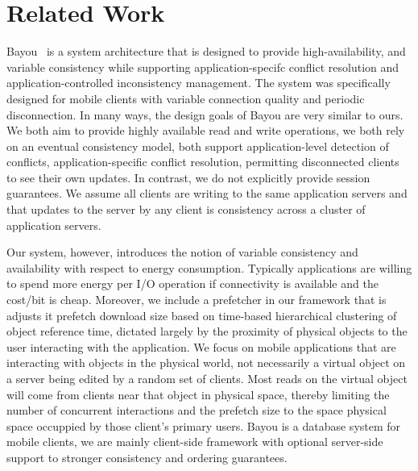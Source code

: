 \section{Related Work}
Bayou~\cite{bayou} is a system architecture that is designed to provide high-availability,
and variable consistency while supporting application-specifc conflict resolution
and application-controlled inconsistency management.  The system was specifically
designed for mobile clients with variable connection quality and periodic disconnection.
In many ways, the design goals of Bayou are very similar to ours.  We both aim to provide highly 
available read and write operations, we both rely on an eventual consistency model, both support
application-level detection of conflicts, application-specific conflict resolution, permitting
disconnected clients to see their own updates.  In contrast, we do not explicitly provide session
guarantees.  We assume all clients are writing to the same application servers and that updates to the server
by any client is consistency across a cluster of application servers.

Our system, however, introduces the notion of variable consistency and availability with respect
to energy consumption.  Typically applications are willing to spend more energy per I/O operation if 
connectivity is available and the cost/bit is cheap.  Moreover, we include a prefetcher in our framework that
is adjusts it prefetch download size based on time-based hierarchical clustering of object reference time, dictated
largely by the proximity of physical objects to the user interacting with the application.  We focus on
mobile applications that are interacting with objects in the physical world, not necessarily a virtual
object on a server being edited by a random set of clients.  Most reads on the virtual object
will come from clients near that object in physical space, thereby limiting the number of concurrent
interactions and the prefetch size to the space physical space occuppied by those client's primary users.
Bayou is a database system for mobile clients, we are mainly client-side framework with optional server-side
support to stronger consistency and ordering guarantees.


